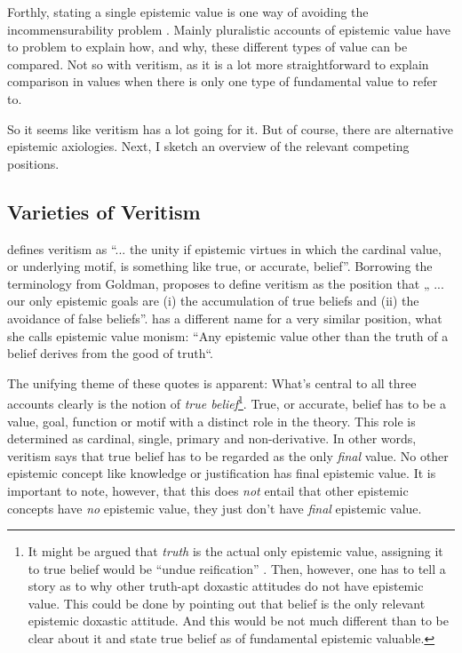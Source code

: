 \documentclass[12pt,numbers=noenddot]{scrartcl}
\begin{document}
Forthly, stating a single epistemic value is one way of avoiding the incommensurability problem \autocite[16]{sep-value-theory}. Mainly pluralistic accounts of epistemic value have to problem to explain how, and why, these different types of value can be compared. Not so with veritism, as it is a lot more straightforward to explain comparison in values when there is only one type of fundamental value to refer to.

So it seems like veritism has a lot going for it. But of course, there are alternative epistemic axiologies. Next, I sketch an overview of the relevant competing positions.

\subsection{Varieties of Veritism}\label{sec:varieties}

\textcite[54]{Goldman2002-GOLTUO-2} defines veritism as  “... the unity if epistemic virtues in which the cardinal value, or underlying motif, is something like true, or accurate, belief”. Borrowing the terminology from Goldman, \textcite[360]{Berker2013-BERETA-2} proposes to define veritism as the position that „ ... our only epistemic goals are (i) the accumulation of true beliefs and (ii) the avoidance of false beliefs”. \textcite{Zagzebski2004-ZAGEVM-2} has a different name for a very similar position, what she calls epistemic value monism: “Any epistemic value other than the truth of a belief derives from the good of truth“. 

The unifying theme of these quotes is apparent: What’s central to all three accounts clearly is the notion of \emph{true belief}\footnote{It might be argued that \emph{truth} is the actual only epistemic value, assigning it to true belief would be “undue reification” \autocite{Pritchard2014}. Then, however, one has to tell a story as to why other truth-apt doxastic attitudes do not have epistemic value. This could be done by pointing out that belief is the only relevant epistemic doxastic attitude. And this would be not much different than to be clear about it and state true belief as of fundamental epistemic valuable.}. True, or accurate, belief has to be a value, goal, function or motif with a distinct role in the theory. This role is determined as cardinal, single, primary and non-derivative. In other words, veritism says that true belief has to be regarded as the only \emph{final} value. No other epistemic concept like knowledge or justification has final epistemic value. It is important to note, however, that this does \emph{not} entail that other epistemic concepts have \emph{no} epistemic value, they just don’t have \emph{final} epistemic value.
\end{document}
